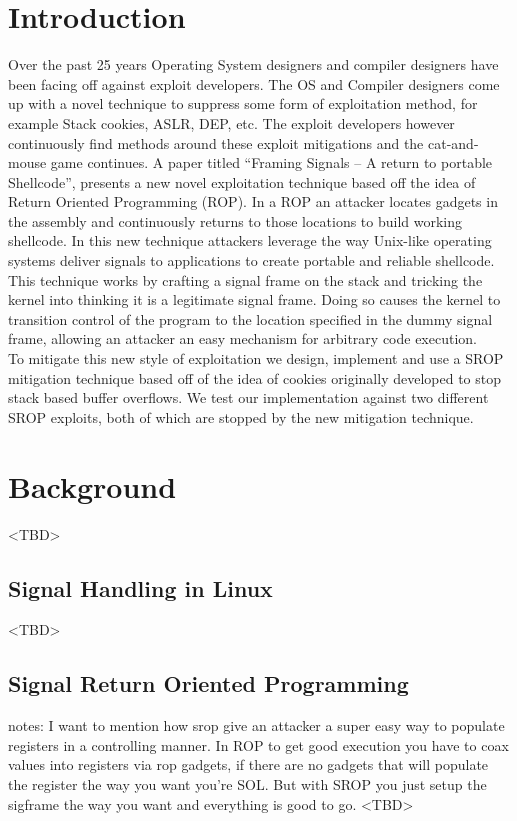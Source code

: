 \documentclass{sig-alternate-05-2015}
\begin{document}
\section{Introduction}
Over the past 25 years Operating System designers and compiler designers have been facing off against exploit developers. The OS and Compiler designers  come up with a novel technique to suppress some form of exploitation method, for example Stack cookies, ASLR, DEP, etc. The exploit developers however continuously find methods around these exploit mitigations and the cat-and-mouse game continues.  A paper titled “Framing Signals -- A return to portable Shellcode”,  presents a new novel exploitation technique based off the idea of Return Oriented Programming (ROP). In a ROP an attacker locates gadgets in the assembly and continuously returns to those locations to build working shellcode. In this new technique attackers leverage the way Unix-like operating systems deliver signals to applications to create portable and reliable shellcode. This technique works by crafting a signal frame on the stack and tricking the kernel into thinking it is a legitimate signal frame. Doing so causes the kernel to transition control of the program to the location specified in the dummy signal frame, allowing an attacker an easy mechanism for arbitrary code execution.\\
\indent
To mitigate this new style of exploitation we design, implement and use a SROP mitigation technique based off of the idea of cookies originally developed to stop stack based buffer overflows. We test our implementation against two different SROP exploits, both of which are stopped by the new mitigation technique.

\section {Background}
<TBD>
\subsection{Signal Handling in Linux}
<TBD>
\subsection{Signal Return Oriented Programming}
notes: 
I want to mention how srop give an attacker a super easy way to populate registers in a controlling manner. In ROP to get good execution you have to coax values into registers via rop gadgets, if there are no gadgets that will populate the register the way you want you're SOL. But with SROP you just setup the sigframe the way you want and everything is good to go.
<TBD>
\end{document}
